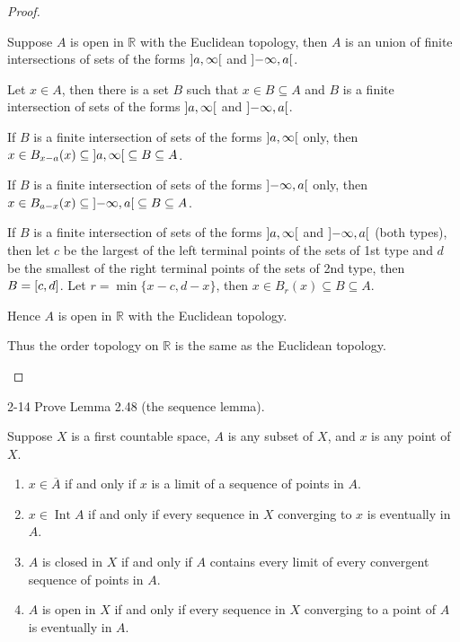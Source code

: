 \begin{proof}
\begin{enumerate}[label={(\alph*)}]
		      Suppose $A$ is open in $\mathbb{R}$ with the Euclidean topology, then $A$ is an union of finite intersections of sets of the forms $\left]{a,\infty}\right[$ and $\left]{-\infty,a}\right[$.

		      Let $x\in A$, then there is a set $B$ such that $x\in B\subseteq A$ and $B$ is a finite intersection of sets of the forms $\left]{a,\infty}\right[$ and $\left]{-\infty,a}\right[$.

		      If $B$ is a finite intersection of sets of the forms $\left]{a,\infty}\right[$ only, then $x\in B_{x - a}(x)\subseteq \left]{a,\infty}\right[ \subseteq B\subseteq A$.

		      If $B$ is a finite intersection of sets of the forms $\left]{-\infty,a}\right[$ only, then $x\in B_{a - x}(x)\subseteq \left]{-\infty,a}\right[\subseteq B\subseteq A$.

		      If $B$ is a finite intersection of sets of the forms $\left]{a,\infty}\right[$ and $\left]{-\infty,a}\right[$ (both types), then let $c$ be the largest of the left terminal points of the sets of 1st type and $d$ be the smallest of the right terminal points of the sets of 2nd type, then $B = \left[{c, d}\right]$. Let $r = \min\{ x - c, d - x \}$, then $x\in B_{r}(x)\subseteq B\subseteq A$.

		      Hence $A$ is open in $\mathbb{R}$ with the Euclidean topology.

		      Thus the order topology on $\mathbb{R}$ is the same as the Euclidean topology.
	\end{enumerate}
\end{proof}

\begin{problem}{2-14}\label{problem:2-14}
Prove Lemma 2.48 (the sequence lemma).

Suppose $X$ is a first countable space, $A$ is any subset of $X$, and $x$ is any point of $X$.
\begin{enumerate}[label={(\alph*)}]
	\item $x\in \overline{A}$ if and only if $x$ is a limit of a sequence of points in $A$.
	\item $x\in\operatorname{Int}A$ if and only if every sequence in $X$ converging to $x$ is eventually in $A$.
	\item $A$ is closed in $X$ if and only if $A$ contains every limit of every convergent sequence of points in $A$.
	\item $A$ is open in $X$ if and only if every sequence in $X$ converging to a point of $A$ is eventually in $A$.
\end{enumerate}
\end{problem}

